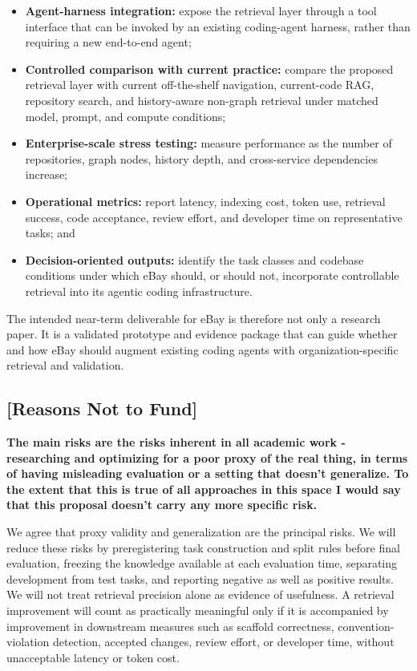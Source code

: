 \documentclass[11pt]{article}
\begin{document}
\begin{itemize}
  \item \textbf{Agent-harness integration:} expose the retrieval layer through a tool interface that can be invoked by an existing coding-agent harness, rather than requiring a new end-to-end agent;
  \item \textbf{Controlled comparison with current practice:} compare the proposed retrieval layer with current off-the-shelf navigation, current-code RAG, repository search, and history-aware non-graph retrieval under matched model, prompt, and compute conditions;
  \item \textbf{Enterprise-scale stress testing:} measure performance as the number of repositories, graph nodes, history depth, and cross-service dependencies increase;
  \item \textbf{Operational metrics:} report latency, indexing cost, token use, retrieval success, code acceptance, review effort, and developer time on representative tasks; and
  \item \textbf{Decision-oriented outputs:} identify the task classes and codebase conditions under which eBay should, or should not, incorporate controllable retrieval into its agentic coding infrastructure.
\end{itemize}

The intended near-term deliverable for eBay is therefore not only a research paper. It is a validated prototype and evidence package that can guide whether and how eBay should augment existing coding agents with organization-specific retrieval and validation.

\subsection*{[Reasons Not to Fund]}

\textbf{The main risks are the risks inherent in all academic work - researching and optimizing for a poor proxy of the real thing, in terms of having misleading evaluation or a setting that doesn't generalize. To the extent that this is true of all approaches in this space I would say that this proposal doesn't carry any more specific risk.} 

We agree that proxy validity and generalization are the principal risks. We will reduce these risks by preregistering task construction and split rules before final evaluation, freezing the knowledge available at each evaluation time, separating development from test tasks, and reporting negative as well as positive results. We will not treat retrieval precision alone as evidence of usefulness. A retrieval improvement will count as practically meaningful only if it is accompanied by improvement in downstream measures such as scaffold correctness, convention-violation detection, accepted changes, review effort, or developer time, without unacceptable latency or token cost.
\end{document}
